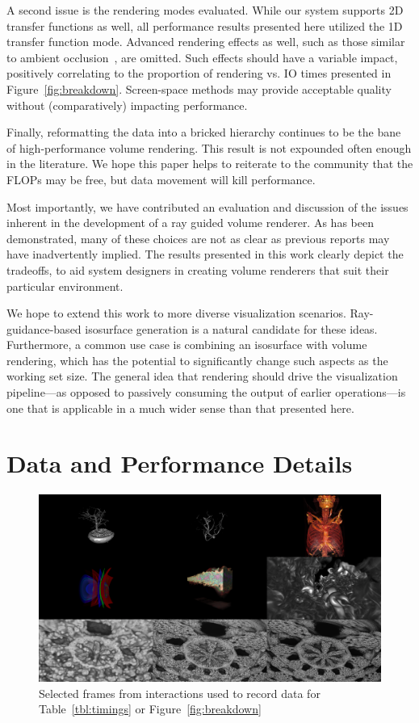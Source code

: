 A second issue is the rendering modes evaluated.  While our system
supports 2D transfer functions as well, all performance results
presented here utilized the 1D transfer function mode.  Advanced
rendering effects as well, such as those similar to ambient
occlusion~\cite{Schott:2009:DAOVR}, are omitted.  Such effects should
have a variable impact, positively correlating to the proportion of
rendering vs. IO times presented in
Figure~\ref{fig:breakdown}.  Screen-space methods may provide
acceptable quality without (comparatively) impacting performance.

Finally, reformatting the data into a bricked hierarchy continues to
be the bane of high-performance volume rendering.  This result is not
expounded often enough in the literature.  We hope this paper helps
to reiterate to the community that the FLOPs may be free, but data
movement will kill performance.

Most importantly, we have contributed an evaluation and discussion
of the issues inherent in the development of a ray guided volume
renderer. As has been demonstrated, many of these choices are not as
clear as previous reports may have inadvertently implied.  The results
presented in this work clearly depict the tradeoffs, to aid system
designers in creating volume renderers that suit their particular
environment.

We hope to extend this work to more diverse visualization scenarios.
Ray-guidance-based isosurface generation is a natural candidate for
these ideas.  Furthermore, a common use case is combining an isosurface
with volume rendering, which has the potential to significantly change
such aspects as the working set size.  The general idea that rendering
should drive the visualization pipeline---as opposed to passively
consuming the output of earlier operations---is one that is applicable
in a much wider sense than that presented here.

\section{Data and Performance Details}
\label{sec:data}

\begin{figure}
  \centering
  \includegraphics[width=0.98\linewidth]{images/rg/perFramesSmall.png}
  \caption{Selected frames from interactions used to record data for
  Table~\ref{tbl:timings} or Figure~\ref{fig:breakdown}}
  \label{fig:perFrames}
\end{figure}

